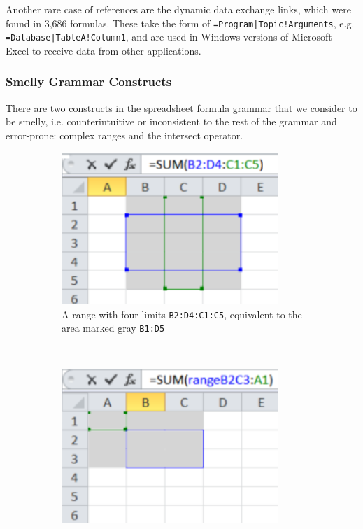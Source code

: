 \documentclass[conference]{IEEEtran}
\begin{document}
Another rare case of references are the dynamic data exchange links, which were found in 3,686 formulas. These take the form of \texttt{=Program|Topic!Arguments}, e.g. \texttt{=Database|TableA!Column1}, and are used in Windows versions of Microsoft Excel to receive  data from other applications.

\subsubsection{Smelly Grammar Constructs}
There are two constructs in the spreadsheet formula grammar that we consider to be smelly, i.e. counterintuitive or inconsistent to the rest of the grammar and error-prone: complex ranges and the intersect operator.
\begin{figure}
	\centering
	\begin{subfigure}[b]{0.4\textwidth}
		\centering
		\includegraphics[width=0.9\textwidth]{complexRanges}
		\vspace{0.0001mm}
		\caption{A range with four limits \texttt{B2:D4:C1:C5}, equivalent to the area marked gray \texttt{B1:D5}}
		\label{fig:complexA}
	\end{subfigure}
	~ %
	\begin{subfigure}[b]{0.4\textwidth}
		\centering
		\includegraphics[width=0.9\textwidth]{complexNamedRanges}

\end{subfigure}
\end{figure}
\end{document}
